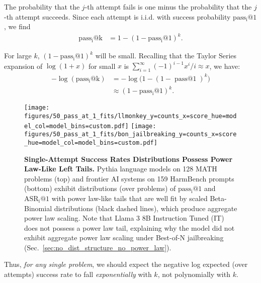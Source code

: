 The probability that the $j$-th attempt fails is one minus the probability that the $j$-th attempt succeeds. Since each attempt is i.i.d. with success probability $\operatorname{pass_i@1}$, we find
%
\begin{align}
    \operatorname{pass_i@k}
    &= 1 - (1 - \operatorname{pass_i@1})^k.
\end{align}

For large $k$, $(1 - \operatorname{pass_i@1})^k$ will be small. Recalling that the Taylor Series expansion of $\log (1 + x)$ for small $x$ is $\sum_{i=1}^{\infty} (-1)^{i-1} x^i / i \approx x$, we have:
%
\begin{align}
    -\log (\operatorname{pass_i@k} )
    &= - \log \Big(1 - (1 - \operatorname{pass@1})^k \Big)\\
    &\approx (1 - \operatorname{pass_i@1})^k.
\end{align}


\begin{figure*}[t!]
    \centering
    \texttt{[image: figures/50\_pass\_at\_1\_fits/llmonkey\_y=counts\_x=score\_hue=model\_col=model\_bins=custom.pdf]}
    \texttt{[image: figures/50\_pass\_at\_1\_fits/bon\_jailbreaking\_y=counts\_x=score\_hue=model\_col=model\_bins=custom.pdf]}
    \caption{\textbf{Single-Attempt Success Rates  Distributions Possess Power Law-Like Left Tails.} Pythia language models on 128 MATH problems (top) and frontier AI systems on 159 HarmBench prompts (bottom) exhibit distributions (over problems) of $\operatorname{pass_i@1}$ and $\operatorname{ASR_i@1}$ with power law-like tails that are well fit by scaled Beta-Binomial distributions (black dashed lines), which produce aggregate power law scaling. Note that Llama 3 8B Instruction Tuned (IT) does not possess a power law tail, explaining why the model did not exhibit aggregate power law scaling under Best-of-N jailbreaking (Sec.~\ref{sec:no_dist_structure_no_power_law}).}
    \label{fig:multiple_attempts_pass_at_1_per_datum}
\end{figure*}


Thus, \textit{for any single problem}, we should expect the negative log expected (over attempts) success rate to fall \textit{exponentially} with $k$, not polynomially with $k$. %


